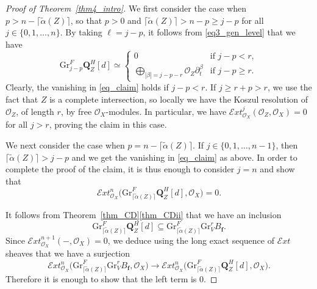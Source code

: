 \documentclass[11pt]{article}
\numberwithin{equation}{section}
\theoremstyle{plain}
\theoremstyle{definition}
\newcommand\Q{{\mathbf Q}}
\newcommand\cE{\mathcal{E}}
\newcommand\cO{\mathcal{O}}
\newcommand\cO{\mathcal{O}}
\newcommand\bff{{\boldsymbol f}}
\let\de\partial
\newcommand\gr{\mathrm{Gr}}
\begin{document}
\begin{proof}[Proof of Theorem~\ref{thm4_intro}]
We first consider the case when $p > n- \lceil \widetilde{\alpha}(Z) \rceil$, so that $p>0$ and $\lceil \widetilde{\alpha}(Z) \rceil > n -p \geq j-p$ for all $j \in \{0,1,\dots, n\}$. By taking $\ell=j-p$, it follows from \eqref{eq3_gen_level} that we have\vspace*{-3pt}
\[ \gr^F_{j-p}\Q^H_Z[d] \simeq \begin{cases}
0& \text{if}\,\,j-p < r, \\
\bigoplus_{|\beta| = j-p -r} \cO_Z \de_t^\beta& \text{if}\,\,j-p \geq r.
\end{cases}\]
Clearly, the vanishing in \eqref{eq_claim} holds if $j-p<r$. If $j\geq r+p > r$, we use the fact that $Z$ is a complete intersection, so
locally we have the Koszul resolution of $\cO_Z$, of length $r$, by free $\cO_X$-modules.
In particular, we have $\cE xt^j_{\cO_X}(\cO_Z,\cO_X) = 0$ for all $j>r$, proving the claim in this case.

We next consider the case when $p = n -\lceil \widetilde{\alpha}(Z) \rceil$. If $j \in \{0,1,\dots, n-1\}$, then $\lceil \widetilde{\alpha}(Z) \rceil>j-p$ and
we get the vanishing in \eqref{eq_claim} as above. In order to complete the proof of the claim, it is thus enough to consider $j=n$ and show that\vspace*{-3pt}
\begin{equation}
\cE xt^n_{\cO_X}\big(\gr^F_{\lceil \widetilde{\alpha}(Z) \rceil} \Q_Z^H[d],\cO_X\big) = 0.
\end{equation}

It follows from Theorem~\ref{thm_CD}\eqref{thm_CDii} that we have an inclusion\vspace*{-3pt}
\[\gr^F_{\lceil \widetilde{\alpha}(Z) \rceil} \Q_Z^H[d] \subseteq \gr^F_{\lceil \widetilde{\alpha}(Z) \rceil} \gr^r_VB_\bff.\]
Since ${\mathcal Ext}_{\cO_X}^{n+1}(-,\cO_X)=0$, we deduce using the long exact sequence of
$\cE xt$ sheaves that we have a surjection\vspace*{-3pt}
\[\cE xt^n_{\cO_X}\big(\gr^F_{\lceil \widetilde{\alpha}(Z) \rceil} \gr^r_V B_\bff,\cO_X\big) \to \cE xt^n_{\cO_X}
\big(\gr^F_{\lceil \widetilde{\alpha}(Z) \rceil}\Q_Z^H[d],\cO_X\big).\]
Therefore it is enough to show that the left term is 0.


\end{proof}
\end{document}
